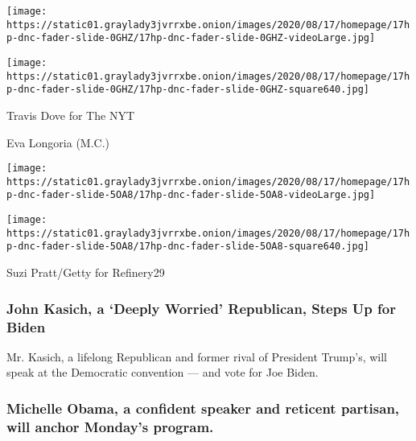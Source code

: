 \texttt{[image: https://static01.graylady3jvrrxbe.onion/images/2020/08/17/homepage/17hp-dnc-fader-slide-0GHZ/17hp-dnc-fader-slide-0GHZ-videoLarge.jpg]}

\texttt{[image: https://static01.graylady3jvrrxbe.onion/images/2020/08/17/homepage/17hp-dnc-fader-slide-0GHZ/17hp-dnc-fader-slide-0GHZ-square640.jpg]}

 Travis Dove for The NYT

Eva Longoria (M.C.)

\texttt{[image: https://static01.graylady3jvrrxbe.onion/images/2020/08/17/homepage/17hp-dnc-fader-slide-5OA8/17hp-dnc-fader-slide-5OA8-videoLarge.jpg]}

\texttt{[image: https://static01.graylady3jvrrxbe.onion/images/2020/08/17/homepage/17hp-dnc-fader-slide-5OA8/17hp-dnc-fader-slide-5OA8-square640.jpg]}

 Suzi Pratt/Getty for Refinery29

\href{https://www.nytimes3xbfgragh.onion/2020/08/17/us/politics/john-kasich-biden.html}{}

\hypertarget{john-kasich-a-deeply-worried-republican-steps-up-for-biden}{%
\subsubsection{John Kasich, a `Deeply Worried' Republican, Steps Up for
Biden}\label{john-kasich-a-deeply-worried-republican-steps-up-for-biden}}

\href{https://www.nytimes3xbfgragh.onion/2020/08/17/us/politics/john-kasich-biden.html}{}

Mr. Kasich, a lifelong Republican and former rival of President Trump's,
will speak at the Democratic convention --- and vote for Joe Biden.

\href{https://www.nytimes3xbfgragh.onion/live/2020/08/17/us/dnc-convention?action=click\&module=Spotlight\&pgtype=Homepage\#michelle-obama-a-confident-performer-and-reticent-partisan-will-anchor-mondays-program}{}

\hypertarget{michelle-obama-a-confident-speaker-and-reticent-partisan-will-anchor-mondays-program}{%
\subsubsection{Michelle Obama, a confident speaker and reticent
partisan, will anchor Monday's
program.}\label{michelle-obama-a-confident-speaker-and-reticent-partisan-will-anchor-mondays-program}}

\href{https://www.nytimes3xbfgragh.onion/2020/08/17/upshot/polls-2020-election-convention.html}{}

